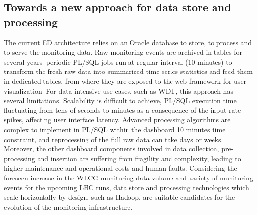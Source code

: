 \subsection{Towards a new approach for data store and processing} 

The current ED architecture relies on an Oracle database to store, to process
and to serve the monitoring data. Raw monitoring events are archived in tables
for several years, periodic PL/SQL jobs run at regular interval (10 minutes) to
transform the fresh raw data into summarized time-series statistics and feed
them in dedicated tables, from where they are exposed to the web-framework for
user visualization. For data intensive use cases, such as WDT, this approach
has several limitations. Scalability is difficult to achieve, PL/SQL execution
time fluctuating from tens of seconds to minutes as a consequence of the input
rate spikes, affecting user interface latency. Advanced processing algorithms
are complex to implement in PL/SQL within the dashboard 10 minutes time
constraint, and reprocessing of the full raw data can take days or weeks.
Moreover, the other dashboard components involved in data collection,
pre-processing and insertion are suffering from fragility and complexity,
leading to higher maintenance and operational costs and human faults.
Considering the foreseen increase in the WLCG monitoring data volume and
variety of monitoring events for the upcoming LHC runs, data store and
processing technologies which scale horizontally by design, such as Hadoop, are
suitable candidates for the evolution of the monitoring infrastructure. 
 





